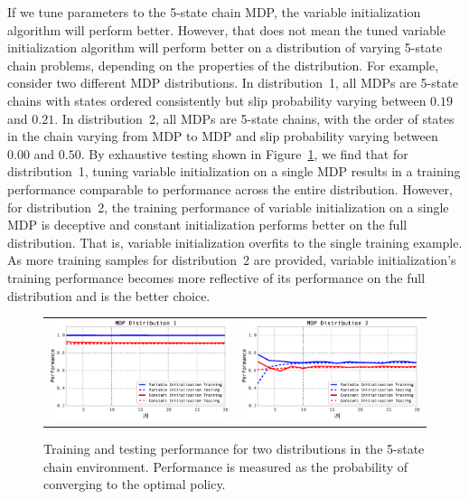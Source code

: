 If we tune parameters to the 5-state chain MDP, the variable initialization algorithm will perform better. However, that does not mean the tuned variable initialization algorithm will perform better on a distribution of varying 5-state chain problems, depending on the properties of the distribution. For example, consider two different MDP distributions. In distribution~1, all MDPs are 5-state chains with states ordered consistently but slip probability varying between $0.19$ and $0.21$. In distribution~2, all MDPs are 5-state chains, with the order of states in the chain varying from MDP to MDP and slip probability varying between $0.00$ and $0.50$. By exhaustive testing shown in Figure~\ref{fig:underfit}, we find that for distribution~1, tuning variable initialization on a single MDP results in a training performance comparable to performance across the entire distribution. However, for distribution~2, the training performance of variable initialization on a single MDP is deceptive and constant initialization performs better on the full distribution. That is, variable initialization overfits to the single training example. As more training samples for distribution~2 are provided, variable initialization's training performance becomes more reflective of its performance on the full distribution and is the better choice.
\begin{figure}
\centering
\begin{tabular}{cc}
\includegraphics[width=.45\columnwidth]{images/mdp_distribution1} &
\includegraphics[width=.45\columnwidth]{images/mdp_distribution2}
\end{tabular}
\caption{Training and testing performance for two distributions in the 5-state chain environment. Performance is measured as the probability of converging to the optimal policy.}
\label{fig:underfit}
\end{figure}

